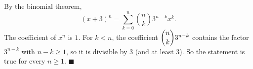 By the binomial theorem,
\[(x+3)^n=\sum_{k=0}^{n}\binom nk3^{n-k}x^k.\]
The coefficient of $x^n$ is $1$. For $k<n$, the coefficient $\dbinom nk3^{n-k}$ contains the factor $3^{n-k}$ with $n-k\ge1$, so it is divisible by $3$ (and at least $3$). So the statement is $\boxed{\text{true}}$ for every $n\ge1$. $\blacksquare$
